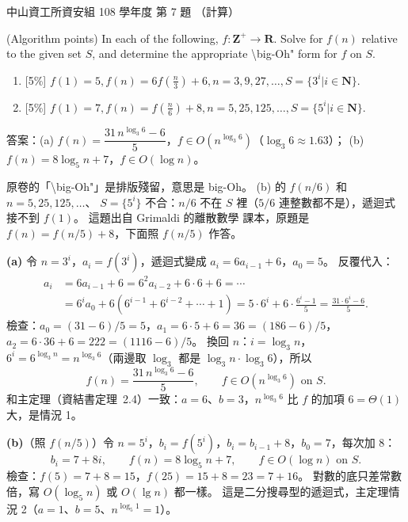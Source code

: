 \begin{pastexam}[label={px:nsysu-108-dmalg-03}]{中山資工所資安組 108 學年度 第 7 題}
（計算）

(Algorithm points) In each of the following, $f:\mathbf{Z}^+\to\mathbf{R}$. Solve for $f(n)$ relative
to the given set $S$, and determine the appropriate \textbackslash big-Oh" form for $f$ on $S$.
\begin{enumerate}[label=(\alph*)]
\item {[5\%]} $f(1)=5, f(n)=6f\left(\frac{n}{3}\right)+6, n=3,9,27,\ldots, S=\{3^i|i\in\mathbf{N}\}$.
\item {[5\%]} $f(1)=7, f(n)=f\left(\frac{n}{6}\right)+8, n=5,25,125,\ldots, S=\{5^i|i\in\mathbf{N}\}$.
\end{enumerate}
\end{pastexam}

\begin{pastsoln}
答案：(a) $f(n) = \dfrac{31\, n^{\log_3 6} - 6}{5}$，$f \in O(n^{\log_3 6})$（$\log_3 6 \approx 1.63$）；
(b) $f(n) = 8\log_5 n + 7$，$f \in O(\log n)$。

原卷的「\textbackslash big-Oh"」是排版殘留，意思是 big-Oh。 (b) 的 $f(n/6)$ 和 $n = 5, 25, 125, \ldots$、
$S = \{5^i\}$ 不合：$n/6$ 不在 $S$ 裡（$5/6$ 連整數都不是），遞迴式接不到 $f(1)$。 這題出自 Grimaldi 的離散數學
課本，原題是 $f(n) = f(n/5) + 8$，下面照 $f(n/5)$ 作答。

\textbf{(a)} 令 $n = 3^i$，$a_i = f(3^i)$，遞迴式變成 $a_i = 6a_{i-1} + 6$，$a_0 = 5$。 反覆代入：
\begin{align*}
a_i &= 6a_{i-1} + 6 = 6^2 a_{i-2} + 6 \cdot 6 + 6 = \cdots\\
&= 6^i a_0 + 6(6^{i-1} + 6^{i-2} + \cdots + 1) = 5 \cdot 6^i + 6 \cdot \frac{6^i - 1}{5}
= \frac{31 \cdot 6^i - 6}{5}.
\end{align*}
檢查：$a_0 = (31 - 6)/5 = 5$，$a_1 = 6 \cdot 5 + 6 = 36 = (186 - 6)/5$，$a_2 = 6 \cdot 36 + 6 = 222 =
(1116 - 6)/5$。 換回 $n$：$i = \log_3 n$，$6^i = 6^{\log_3 n} = n^{\log_3 6}$（兩邊取 $\log_3$ 都是
$\log_3 n \cdot \log_3 6$），所以
\[
f(n) = \frac{31\, n^{\log_3 6} - 6}{5}, \qquad f \in O(n^{\log_3 6}) \text{ on } S .
\]
和主定理（資結書定理~2.4）一致：$a = 6$、$b = 3$，$n^{\log_3 6}$ 比 $f$ 的加項 $6 = \Theta(1)$ 大，是情況 1。

\textbf{(b)}（照 $f(n/5)$）令 $n = 5^i$，$b_i = f(5^i)$，$b_i = b_{i-1} + 8$，$b_0 = 7$，每次加 $8$：
\[
b_i = 7 + 8i, \qquad f(n) = 8\log_5 n + 7, \qquad f \in O(\log n) \text{ on } S .
\]
檢查：$f(5) = 7 + 8 = 15$，$f(25) = 15 + 8 = 23 = 7 + 16$。 對數的底只差常數倍，寫 $O(\log_5 n)$ 或
$O(\lg n)$ 都一樣。 這是二分搜尋型的遞迴式，主定理情況 2（$a = 1$、$b = 5$、$n^{\log_5 1} = 1$）。
\end{pastsoln}
